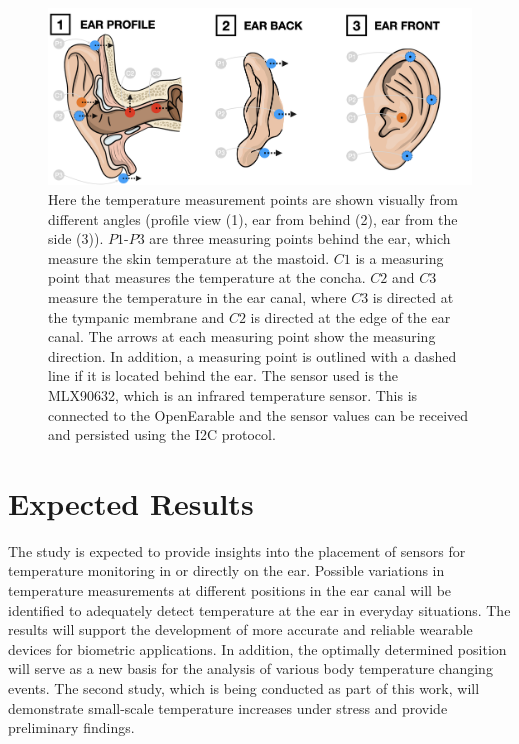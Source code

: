 \begin{figure}
    \centering
    \includegraphics[scale=0.26]{thesis-doc/images/ear_measurement_points/emp.png}
    \caption{Here the temperature measurement points are shown visually from different angles (profile view (1), ear from behind (2), ear from the side (3)). $P1$-$P3$ are three measuring points behind the ear, which measure the skin temperature at the mastoid. $C1$ is a measuring point that measures the temperature at the concha. $C2$ and $C3$ measure the temperature in the ear canal, where $C3$ is directed at the tympanic membrane and $C2$ is directed at the edge of the ear canal. The arrows at each measuring point show the measuring direction. In addition, a measuring point is outlined with a dashed line if it is located behind the ear. The sensor used is the MLX90632, which is an infrared temperature sensor. This is connected to the OpenEarable and the sensor values can be received and persisted using the I2C protocol.}
    \label{fig:ear_measurement_positions}
\end{figure}

\section{Expected Results}
\label{ch:Introduction:ExpectedResults}
The study is expected to provide insights into the placement of sensors for temperature monitoring in or directly on the ear.
Possible variations in temperature measurements at different positions in the ear canal will be identified to adequately detect temperature at the ear in everyday situations.
The results will support the development of more accurate and reliable wearable devices for biometric applications. 
In addition, the optimally determined position will serve as a new basis for the analysis of various body temperature changing events.
The second study, which is being conducted as part of this work, will demonstrate small-scale temperature increases under stress and provide preliminary findings.
